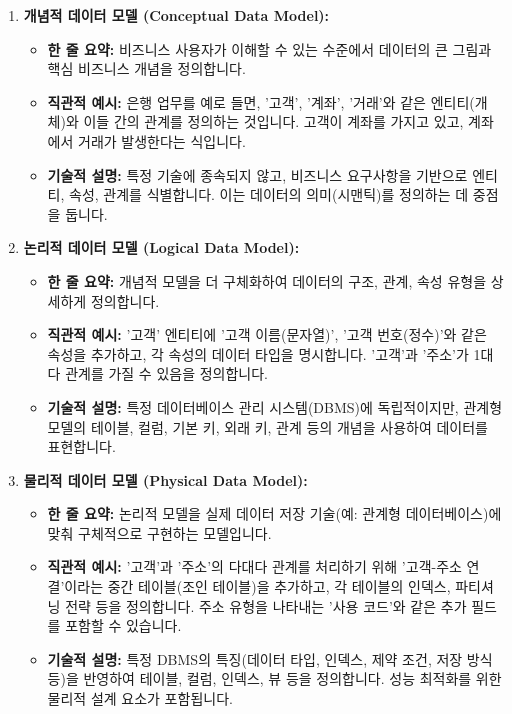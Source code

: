 \documentclass[11pt,a4paper]{article}
\theoremstyle{definition}
\begin{document}
\begin{enumerate}
    \item \textbf{개념적 데이터 모델 (Conceptual Data Model):}
    \begin{itemize}
        \item \textbf{한 줄 요약:} 비즈니스 사용자가 이해할 수 있는 수준에서 데이터의 큰 그림과 핵심 비즈니스 개념을 정의합니다.
        \item \textbf{직관적 예시:} 은행 업무를 예로 들면, '고객', '계좌', '거래'와 같은 엔티티(개체)와 이들 간의 관계를 정의하는 것입니다. 고객이 계좌를 가지고 있고, 계좌에서 거래가 발생한다는 식입니다.
        \item \textbf{기술적 설명:} 특정 기술에 종속되지 않고, 비즈니스 요구사항을 기반으로 엔티티, 속성, 관계를 식별합니다. 이는 데이터의 의미(시맨틱)를 정의하는 데 중점을 둡니다.
    \end{itemize}

    \item \textbf{논리적 데이터 모델 (Logical Data Model):}
    \begin{itemize}
        \item \textbf{한 줄 요약:} 개념적 모델을 더 구체화하여 데이터의 구조, 관계, 속성 유형을 상세하게 정의합니다.
        \item \textbf{직관적 예시:} '고객' 엔티티에 '고객 이름(문자열)', '고객 번호(정수)'와 같은 속성을 추가하고, 각 속성의 데이터 타입을 명시합니다. '고객'과 '주소'가 1대 다 관계를 가질 수 있음을 정의합니다.
        \item \textbf{기술적 설명:} 특정 데이터베이스 관리 시스템(DBMS)에 독립적이지만, 관계형 모델의 테이블, 컬럼, 기본 키, 외래 키, 관계 등의 개념을 사용하여 데이터를 표현합니다.
    \end{itemize}

    \item \textbf{물리적 데이터 모델 (Physical Data Model):}
    \begin{itemize}
        \item \textbf{한 줄 요약:} 논리적 모델을 실제 데이터 저장 기술(예: 관계형 데이터베이스)에 맞춰 구체적으로 구현하는 모델입니다.
        \item \textbf{직관적 예시:} '고객'과 '주소'의 다대다 관계를 처리하기 위해 '고객-주소 연결'이라는 중간 테이블(조인 테이블)을 추가하고, 각 테이블의 인덱스, 파티셔닝 전략 등을 정의합니다. 주소 유형을 나타내는 '사용 코드'와 같은 추가 필드를 포함할 수 있습니다.
        \item \textbf{기술적 설명:} 특정 DBMS의 특징(데이터 타입, 인덱스, 제약 조건, 저장 방식 등)을 반영하여 테이블, 컬럼, 인덱스, 뷰 등을 정의합니다. 성능 최적화를 위한 물리적 설계 요소가 포함됩니다.
    \end{itemize}
\end{enumerate}
\end{document}
